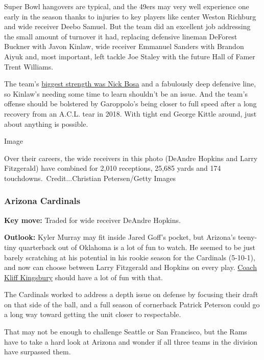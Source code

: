 Super Bowl hangovers are typical, and the 49ers may very well experience
one early in the season thanks to injuries to key players like center
Weston Richburg and wide receiver Deebo Samuel. But the team did an
excellent job addressing the small amount of turnover it had, replacing
defensive lineman DeForest Buckner with Javon Kinlaw, wide receiver
Emmanuel Sanders with Brandon Aiyuk and, most important, left tackle Joe
Staley with the future Hall of Famer Trent Williams.

The team's
\href{https://www.nytimes3xbfgragh.onion/2020/01/11/sports/football/49ers-nick-bosa.html}{biggest
strength was Nick Bosa} and a fabulously deep defensive line, so
Kinlaw's needing some time to learn shouldn't be an issue. And the
team's offense should be bolstered by Garoppolo's being closer to full
speed after a long recovery from an A.C.L. tear in 2018. With tight end
George Kittle around, just about anything is possible.

Image

Over their careers, the wide receivers in this photo (DeAndre Hopkins
and Larry Fitzgerald) have combined for 2,010 receptions, 25,685 yards
and 174 touchdowns.~Credit...Christian Petersen/Getty Images

\hypertarget{arizona-cardinals}{%
\subsubsection{\texorpdfstring{\textbf{Arizona
Cardinals}}{Arizona Cardinals}}\label{arizona-cardinals}}

\textbf{Key move:} Traded for wide receiver DeAndre Hopkins.

\textbf{Outlook:} Kyler Murray may fit inside Jared Goff's pocket, but
Arizona's teeny-tiny quarterback out of Oklahoma is a lot of fun to
watch. He seemed to be just barely scratching at his potential in his
rookie season for the Cardinals (5-10-1), and now can choose between
Larry Fitzgerald and Hopkins on every play.
\href{https://www.nytimes3xbfgragh.onion/2019/08/13/sports/air-raid-kliff-kingsbury-kyler-murray.html}{Coach
Kliff Kingsbury} should have a lot of fun with that.

The Cardinals worked to address a depth issue on defense by focusing
their draft on that side of the ball, and a full season of cornerback
Patrick Peterson could go a long way toward getting the unit closer to
respectable.

That may not be enough to challenge Seattle or San Francisco, but the
Rams have to take a hard look at Arizona and wonder if all three teams
in the division have surpassed them.


